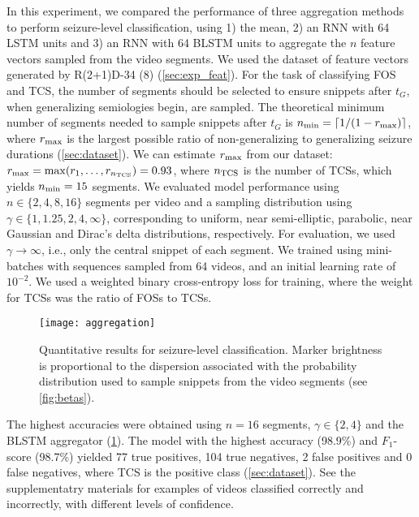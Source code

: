 In this experiment, we compared the performance of three aggregation methods to perform seizure-level classification, using 1) the mean, 2) an \ac{RNN} with 64 \ac{LSTM} units and 3) an \ac{RNN} with 64 \ac{BLSTM} units to aggregate the $n$ feature vectors sampled from the video segments.
We used the dataset of feature vectors generated by R(2+1)D-34 (8) (\cref{sec:exp_feat}).
For the task of classifying \ac{FOS} and \ac{TCS}, the number of segments should be
selected to ensure snippets after $t_G$, when generalizing semiologies begin, are sampled.
The theoretical minimum number of segments needed to sample snippets after $t_G$ is $n_{\text{min}} = \lceil 1 / (1 - r_{\text{max}}) \rceil $,
where $r_{\text{max}}$ is the largest possible ratio of non-generalizing to generalizing seizure durations (\cref{sec:dataset}).
We can estimate $r_{\text{max}}$ from our dataset:
$r_{\text{max}} = \max ( r_1, \dots, r_{n_{\text{TCS}}} ) = 0.93$, where $n_{\text{TCS}}$ is the number of \acp{TCS},
which yields $n_{\text{min}} = 15$ segments.
We evaluated model performance using $n \in \{2, 4, 8, 16\}$ segments per video and a sampling distribution using $\gamma \in \{ 1, 1.25, 2, 4, \infty \}$, corresponding to uniform, near semi-elliptic, parabolic, near Gaussian and Dirac's delta distributions, respectively.
For evaluation, we used $\gamma \rightarrow \infty$, i.e., only the central snippet of each segment.
We trained using mini-batches with sequences sampled from 64 videos, and an initial learning rate of $10 ^ {-2}$.
We used a weighted binary cross-entropy loss for training,
where the weight for \acp{TCS} was the ratio of \acp{FOS} to \acp{TCS}.


\begin{figure}
  \centering
  \texttt{[image: aggregation]}
  \caption[Quantitative results for seizure-level classification]{
    Quantitative results for seizure-level classification.
    Marker brightness is proportional to the dispersion associated with the probability distribution used to sample snippets from the video segments (see \cref{fig:betas}).
  }
  \label{fig:aggregation}
\end{figure}

The highest accuracies were obtained using $n = 16$ segments, $\gamma \in \{ 2, 4 \}$ and the \ac{BLSTM} aggregator (\cref{fig:aggregation}).
The model with the highest accuracy (98.9\%) and $F_1$-score (98.7\%) yielded 77 true positives, 104 true negatives, 2 false positives and 0 false negatives, where \ac{TCS} is the positive class (\cref{sec:dataset}). See the supplementatry materials for examples of videos classified correctly and incorrectly, with different levels of confidence.
